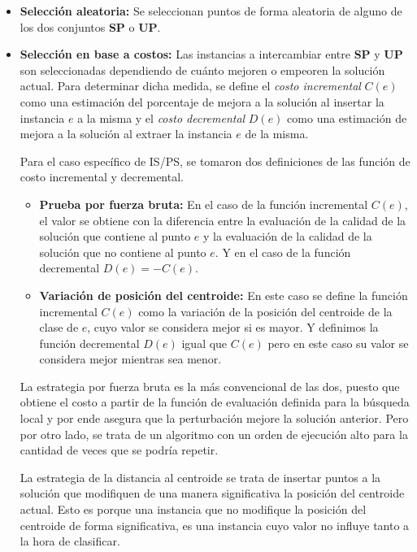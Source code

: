 \documentclass{ci5652}
\begin{document}
\begin{itemize}
    \item \textbf{Selección aleatoria:} Se seleccionan puntos de forma aleatoria de alguno de los dos conjuntos \textbf{SP} o \textbf{UP}.
    \item \textbf{Selección en base a costos:} Las instancias a intercambiar entre \textbf{SP} y \textbf{UP} son seleccionadas dependiendo de cuánto mejoren o empeoren la solución actual. Para determinar dicha medida, se define el \textit{costo incremental} $C(e)$ como una estimación del porcentaje de mejora a la solución al insertar la instancia $e$ a la misma y el \textit{costo decremental} $D(e)$ como una estimación de mejora a la solución al extraer la instancia $e$ de la misma.

    Para el caso específico de IS/PS, se tomaron dos definiciones de las función de costo incremental y decremental.

    \begin{itemize}
        \item \textbf{Prueba por fuerza bruta:} En el caso de la función incremental $C(e)$, el valor se obtiene con la diferencia entre la evaluación de la calidad de la solución que contiene al punto $e$ y la evaluación de la calidad de la solución que no contiene al punto $e$. Y en el caso de la función decremental $D(e) = -C(e)$.

        \item \textbf{Variación de posición del centroide:} En este caso se define la función incremental $C(e)$ como la variación de la posición del centroide de la clase de $e$, cuyo valor se considera mejor si es mayor. Y definimos la función decremental $D(e)$ igual que $C(e)$ pero en este caso su valor se considera mejor mientras sea menor.
    \end{itemize}

    La estrategia por fuerza bruta es la más convencional de las dos, puesto que obtiene el costo a partir de la función de evaluación definida para la búsqueda local y por ende asegura que la perturbación mejore la solución anterior. Pero por otro lado, se trata de un algoritmo con un orden de ejecución alto para la cantidad de veces que se podría repetir.

    La estrategia de la distancia al centroide se trata de insertar puntos a la solución que modifiquen de una manera significativa la posición del centroide actual. Esto es porque una instancia que no modifique la posición del centroide de forma significativa, es una instancia cuyo valor no influye tanto a la hora de clasificar.
\end{itemize}
\end{document}
